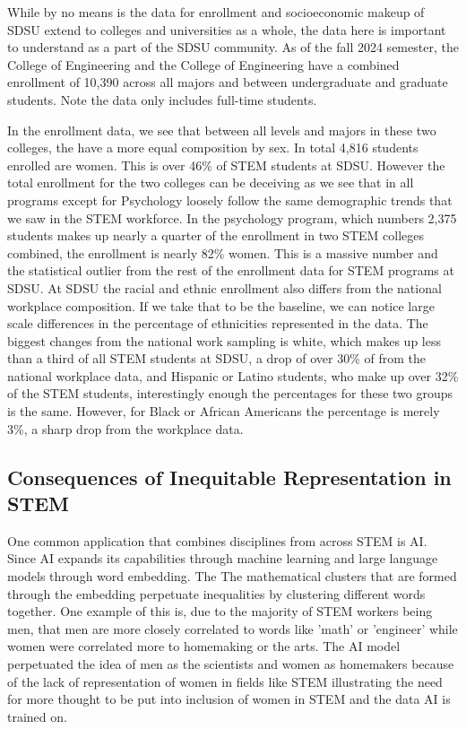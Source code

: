 \documentclass{article}
\begin{document}
While by no means is the data for enrollment and socioeconomic makeup of SDSU extend to colleges and universities as a whole, the data here is important to understand as a part of the SDSU community. As of the fall 2024 semester, the College of Engineering and the College of Engineering have a combined enrollment of 10,390 across all majors and between undergraduate and graduate students. Note the data only includes full-time students.\cite{enrollment2024}

In the enrollment data, we see that between all levels and majors in these two colleges, the have a more equal composition by sex. In total 4,816 students enrolled are women. This is over 46\% of STEM students at SDSU. However the total enrollment for the two colleges can be deceiving as we see that in all programs except for Psychology loosely follow the same demographic trends that we saw in the STEM workforce. In the psychology program, which numbers 2,375 students makes up nearly a quarter of the enrollment in two STEM colleges combined, the enrollment is nearly 82\% women. This is a massive number and the statistical outlier from the rest of the enrollment data for STEM programs at SDSU.
At SDSU the racial and ethnic enrollment also differs from the national workplace composition. If we take that to be the baseline, we can notice large scale differences in the percentage of ethnicities represented in the data. The biggest changes from the national work sampling is white, which makes up less than a third of all STEM students at SDSU, a drop of over 30\% of from the national workplace data, and Hispanic or Latino students, who make up over 32\% of the STEM students, interestingly enough the percentages for these two groups is the same. However, for Black or African Americans the percentage is merely 3\%, a sharp drop from the workplace data.\cite{enrollment2024}\cite{stem2023}

\subsection{Consequences of Inequitable Representation in STEM}

One common application that combines disciplines from across STEM is AI. Since AI expands its capabilities through machine learning and large language models through word embedding. The The mathematical clusters that are formed through the embedding perpetuate inequalities by clustering different words together. One example of this is, due to the majority of STEM workers being men, that men are more closely correlated to words like 'math' or 'engineer' while women were correlated more to homemaking or the arts. The AI model perpetuated the idea of men as the scientists and women as homemakers because of the lack of representation of women in fields like STEM illustrating the need for more thought to be put into inclusion of women in STEM and the data AI is trained on. \cite{devlin2017}
\end{document}
